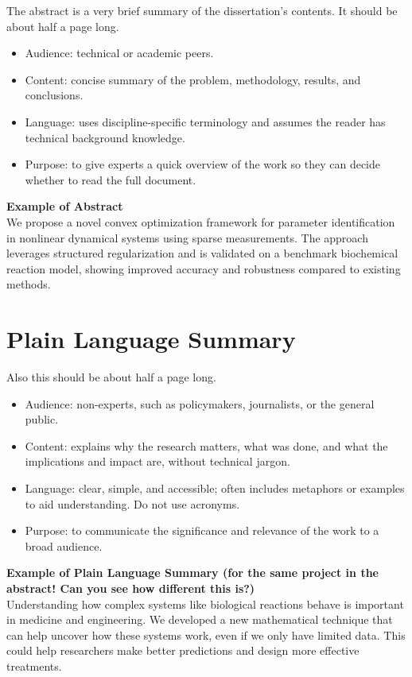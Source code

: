 The abstract is a very brief summary of the dissertation's contents. It should be about half a page long. 

\begin{itemize}
\item Audience: technical or academic peers.
\item Content: concise summary of the problem, methodology, results, and conclusions.
\item Language: uses discipline-specific terminology and assumes the reader has technical background knowledge.
\item Purpose: to give experts a quick overview of the work so they can decide whether to read the full document.
\end{itemize}

\textbf{Example of Abstract}\\
We propose a novel convex optimization framework for parameter identification in nonlinear dynamical systems using sparse measurements. The approach leverages structured regularization and is validated on a benchmark biochemical reaction model, showing improved accuracy and robustness compared to existing methods.


\cleardoublepage{}
{}\mtcaddchapter 
\chapter*{Plain Language Summary}
\addtocounter{counter}{-1}


Also this should be about half a page long.

\begin{itemize}
\item Audience: non-experts, such as policymakers, journalists, or the general public.
\item Content: explains why the research matters, what was done, and what the implications and impact are, without technical jargon.
\item Language: clear, simple, and accessible; often includes metaphors or examples to aid understanding. Do not use acronyms.
\item Purpose: to communicate the significance and relevance of the work to a broad audience.
\end{itemize}


\textbf{Example of Plain Language Summary (for the same project in the abstract! Can you see how different this is?)}\\
Understanding how complex systems like biological reactions behave is important in medicine and engineering. We developed a new mathematical technique that can help uncover how these systems work, even if we only have limited data. This could help researchers make better predictions and design more effective treatments.



